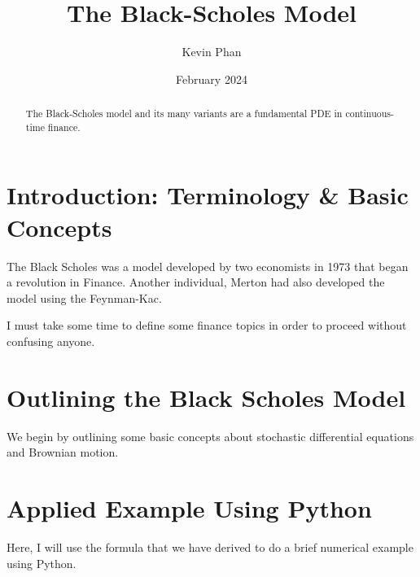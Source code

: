 \documentclass{article}
\title{The Black-Scholes Model}
\author{Kevin Phan}
\date{February 2024}
\begin{document}
\maketitle

\begin{abstract}
    The Black-Scholes model and its many variants are a fundamental PDE in continuous-time finance. 
\end{abstract}

\section{Introduction: Terminology \& Basic Concepts}

The Black Scholes was a model developed by two economists in 1973 that began a revolution in Finance.
Another individual, Merton had also developed the model using the Feynman-Kac. 


I must take some time to define some finance topics in order to proceed without confusing anyone.



\section{Outlining the Black Scholes Model}
We begin by outlining some basic concepts about stochastic differential equations and Brownian motion. 

\section{Applied Example Using Python}

Here, I will use the formula that we have derived to do a brief numerical example using Python.
\end{document}
